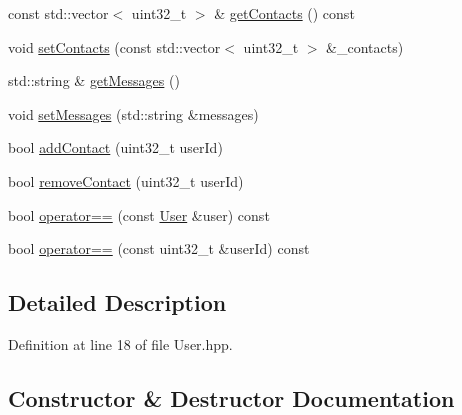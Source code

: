 \begin{DoxyCompactItemize}
const std\+::vector$<$ uint32\+\_\+t $>$ \& \mbox{\hyperlink{classbabel_1_1common_1_1_user_a2765d87c14df492dddcffb1af2a85649}{get\+Contacts}} () const
\item 
void \mbox{\hyperlink{classbabel_1_1common_1_1_user_adc7949c540c63549dbb20b0ea314e622}{set\+Contacts}} (const std\+::vector$<$ uint32\+\_\+t $>$ \&\+\_\+contacts)
\item 
std\+::string \& \mbox{\hyperlink{classbabel_1_1common_1_1_user_a6ab6d31606d207c4a8669ca77372fdad}{get\+Messages}} ()
\item 
void \mbox{\hyperlink{classbabel_1_1common_1_1_user_a0c4a3f92d80b9eaedb4ce0ca42771847}{set\+Messages}} (std\+::string \&messages)
\item 
bool \mbox{\hyperlink{classbabel_1_1common_1_1_user_accfb669d54137d82757a31928053c2c8}{add\+Contact}} (uint32\+\_\+t user\+Id)
\item 
bool \mbox{\hyperlink{classbabel_1_1common_1_1_user_ab2a3d75d5c02fe4a3cd2b9c066bb6445}{remove\+Contact}} (uint32\+\_\+t user\+Id)
\item 
bool \mbox{\hyperlink{classbabel_1_1common_1_1_user_a966aa4761080c430f3028d61bbc91230}{operator==}} (const \mbox{\hyperlink{classbabel_1_1common_1_1_user}{User}} \&user) const
\item 
bool \mbox{\hyperlink{classbabel_1_1common_1_1_user_ae1fa1482613860ede04093a37f9316c0}{operator==}} (const uint32\+\_\+t \&user\+Id) const
\end{DoxyCompactItemize}


\subsection{Detailed Description}


Definition at line 18 of file User.\+hpp.



\subsection{Constructor \& Destructor Documentation}
\mbox{\label{classbabel_1_1common_1_1_user_a0737ac6172fac228854e51e992203339}} 
